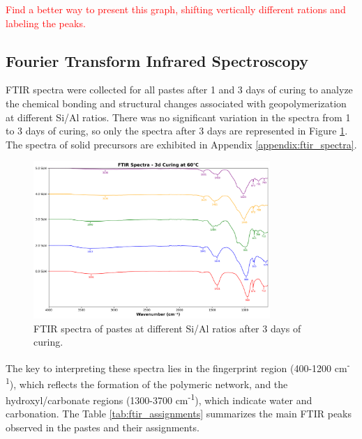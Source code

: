 \textcolor{red}{Find a better way to present this graph, shifting vertically different rations and labeling the peaks.}

\subsection{Fourier Transform Infrared Spectroscopy}

FTIR spectra were collected for all pastes after 1 and 3 days of curing to analyze the chemical bonding and structural changes associated with geopolymerization at different Si/Al ratios.
There was no significant variation in the spectra from 1 to 3 days of curing, so only the spectra after 3 days are represented in Figure \ref{fig:ftir_pastes}.
The spectra of solid precursors are exhibited in Appendix \ref{appendix:ftir_spectra}.

\begin{figure}[H]
    \centering
    \includegraphics[width=0.8\textwidth]{Cap4/images/ftir_comparison_3d_curing.png}
    \caption{FTIR spectra of pastes at different Si/Al ratios after 3 days of curing.}
    \label{fig:ftir_pastes}
\end{figure}

The key to interpreting these spectra lies in the fingerprint region (400-1200 cm\textsuperscript{-1}), which reflects the formation of the polymeric network, and the hydroxyl/carbonate regions (1300-3700 cm\textsuperscript{-1}), which indicate water and carbonation.
The Table \ref{tab:ftir_assignments} summarizes the main FTIR peaks observed in the pastes and their assignments.

